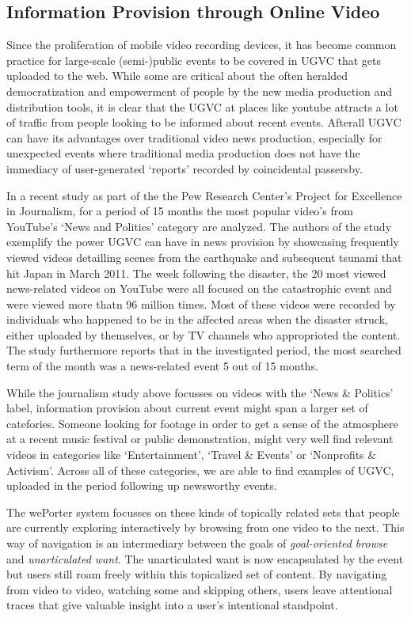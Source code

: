 \subsection{Information Provision through Online Video}

Since the proliferation of mobile video recording devices, it has become common practice for large-scale (semi-)public events to be covered in UGVC that gets uploaded to the web. While some are critical\cite{Jonsson:2011fh} about the often heralded democratization and empowerment of people by the new media production and distribution tools, it is clear that the UGVC at places like youtube attracts a lot of traffic from people looking to be informed about recent events. Afterall UGVC can have its advantages over traditional video news production, especially for unexpected events where traditional media production does not have the immediacy of user-generated `reports' recorded by coincidental passersby. 

In a recent study as part of the the Pew Research Center’s Project for Excellence in Journalism, for a period of 15 months the most popular video's from YouTube's `News and Politics' category are analyzed\cite{Rosenstiel:2012vb}. The authors of the study exemplify the power UGVC can have in news provision by showcasing frequently viewed videos detailling scenes from the earthquake and subsequent tsunami that hit Japan in March 2011. The week following the disaster, the 20 most viewed news-related videos on YouTube were all focused on the catastrophic event and were viewed more thatn 96 million times. Most of these videos were recorded by individuals who happened to be in the affected areas when the disaster struck, either uploaded by themselves, or by TV channels who approprioted the content. The study furthermore reports that in the investigated period, the most searched term of the month was a news-related event 5 out of 15 months.

While the journalism study above focusses on videos with the `News \& Politics' label, information provision about current event might span a larger set of catefories. Someone looking for footage in order to get a sense of the atmosphere at a recent music festival or public demonstration, might very well find relevant videos in categories like `Entertainment', `Travel \& Events' or `Nonprofits \& Activism'. Across all of these categories, we are able to find examples of UGVC, uploaded in the period following up newsworthy events.

The wePorter system focusses on these kinds of topically related sets that people are currently exploring interactively by browsing from one video to the next. This way of navigation is an intermediary between the goals of \textit{goal-oriented browse} and \textit{unarticulated want}. The unarticulated want is now encapsulated by the event but users still roam freely within this topicalized set of content. By navigating from video to video, watching some and skipping others, users leave attentional traces that give valuable insight into a user's intentional standpoint.

